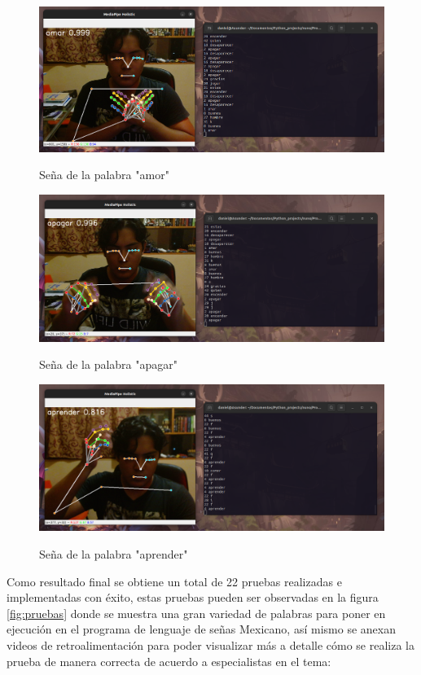 \documentclass[conference]{IEEEtran}
\begin{document}
\begin{figure}[h]
\centering
{\includegraphics[width=0.95\linewidth]{img/07.png}}
\caption{Seña de la palabra "amor"}
\label{fig:7}
\end{figure}

\begin{figure}[h]
\centering
{\includegraphics[width=0.95\linewidth]{img/08.png}}
\caption{Seña de la palabra "apagar"}
\label{fig:8}
\end{figure}

\begin{figure}[h]
\centering
{\includegraphics[width=0.95\linewidth]{img/09.png}}
\caption{Seña de la palabra "aprender"}
\label{fig:9}
\end{figure}

Como resultado final se obtiene un total de 22 pruebas realizadas e implementadas con éxito, estas pruebas pueden ser observadas en la figura \ref{fig:pruebas} donde se muestra una gran variedad de palabras para poner en ejecución en el programa de lenguaje de señas Mexicano, así mismo se anexan videos de retroalimentación para poder visualizar más a detalle cómo se realiza la prueba de manera correcta de acuerdo a especialistas en el tema:
\end{document}
